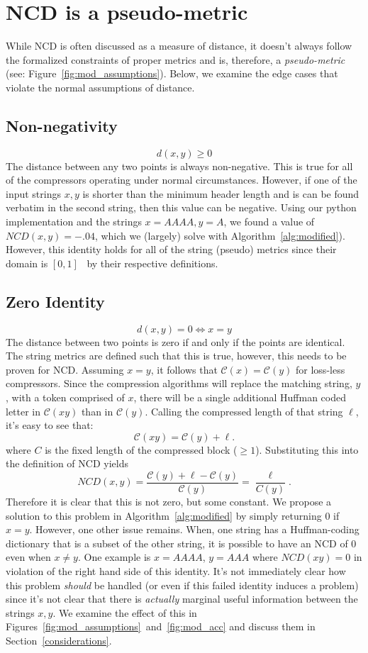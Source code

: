 \documentclass[conference]{IEEEtran}
\begin{document}
\section{NCD is a pseudo-metric}
\label{pseudometric}
While NCD is often discussed as a measure of distance, it doesn't always follow the formalized constraints of proper metrics and is, therefore, a \textit{pseudo-metric} (see: Figure~\ref{fig:mod_assumptions}). Below, we examine the edge cases that violate the normal assumptions of distance.

\subsection{Non-negativity} 
\[
d(x, y) \geq 0
\]
The distance between any two points is always non-negative. This is true for all of the compressors operating under normal circumstances. However, if one of the input strings $x,y$ is shorter than the minimum header length and is can be found verbatim in the second string, then this value can be negative. Using our python implementation and the strings $x=AAAA, y=A$, we found a value of $NCD(x,y) = -.04$, which we (largely) solve with Algorithm~\ref{alg:modified}).
However, this identity holds for all of the string (pseudo) metrics since their domain is $[0,1]$~\cite{metrics,levenshtein} by their respective definitions. 


\subsection{Zero Identity} 
\[
d(x, y) = 0 \iff x = y
\]
The distance between two points is zero if and only if the points are identical. The string metrics are defined such that this is true, however, this needs to be proven for NCD.
Assuming $x = y$, it follows that $\mathcal{C}(x) = \mathcal{C}(y)$ for loss-less compressors.
Since the compression algorithms will replace the matching string, $y$, with a token comprised of $x$, there will be a single additional Huffman coded letter in $\mathcal{C}(xy)$ than in $\mathcal{C}(y)$. Calling the compressed length of that  string $\ell$, it's easy to see that:
$$
\mathcal{C}(xy) = \mathcal{C}(y) + \ell.
$$
where $C$ is the fixed length of the compressed block ($\geq 1$).
Substituting this into the definition of NCD yields
$$
NCD(x,y) = \frac{\mathcal{C}(y) + \ell - \mathcal{C}(y)}{\mathcal{C}(y)} = \frac{\ell}{C(y)}.
$$
Therefore it is clear that this is not zero, but some constant. 
We propose a solution to this problem in Algorithm~\ref{alg:modified} by simply returning 0 if $x=y$. However, one other issue remains. 
When, one string has a Huffman-coding dictionary that is a subset of the other string, it is possible to have an NCD of 0 even when $x \neq y$. One example is $x=AAAA$, $y=AAA$ where $NCD(xy)=0$ in violation of the right hand side of this identity. 
It's not immediately clear how this problem \textit{should} be handled (or even if this failed identity induces a problem) since it's not clear that there is \textit{actually} marginal useful information between the strings $x,y$. 
We examine the effect of this in Figures~\ref{fig:mod_assumptions}~and~\ref{fig:mod_acc} and discuss them in Section~\ref{considerations}.
\end{document}
